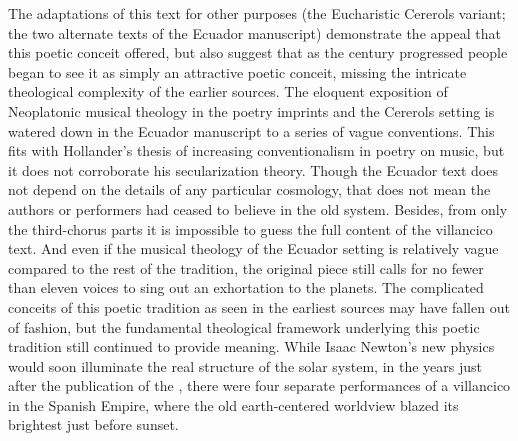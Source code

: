 The adaptations of this text for other purposes (the Eucharistic Cererols
variant; the two alternate texts of the Ecuador manuscript) demonstrate the
appeal that this poetic conceit offered, but also suggest that as the century
progressed people began to see it as simply an attractive poetic conceit,
missing the intricate theological complexity of the earlier sources.
The eloquent exposition of Neoplatonic musical theology in the poetry imprints
and the Cererols setting is watered down in the Ecuador manuscript to a series
of vague conventions.
This fits with Hollander's thesis of increasing conventionalism in poetry on
music, but it does not corroborate his secularization theory.
Though the Ecuador text does not depend on the details of any particular
cosmology, that does not mean the authors or performers had ceased to believe in
the old system.
Besides, from only the third-chorus parts it is impossible to guess the full
content of the villancico text.  And even if the musical theology of the Ecuador
setting is relatively vague compared to the rest of the tradition, the original
piece still calls for no fewer than eleven voices to sing out an exhortation to
the planets.
The complicated conceits of this poetic tradition as seen in the earliest
sources may have fallen out of fashion, but the fundamental theological
framework underlying this poetic tradition still continued to provide meaning.
While Isaac Newton's new physics would soon illuminate the real structure of
the solar system, in the years just after the publication of the
, there were four separate performances of a
 villancico in the Spanish Empire, where the old
earth-centered worldview blazed its brightest just before sunset.



\endinput

